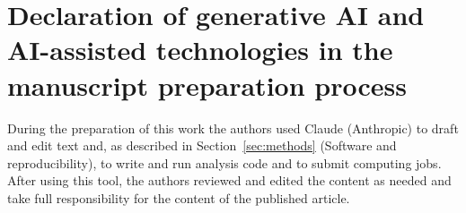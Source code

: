 \section*{Declaration of generative AI and AI-assisted technologies in the manuscript preparation process}
During the preparation of this work the authors used Claude (Anthropic) to draft and edit text and,
as described in Section~\ref{sec:methods} (Software and reproducibility), to write and run analysis
code and to submit computing jobs. After using this tool, the authors reviewed and edited the content
as needed and take full responsibility for the content of the published article.
